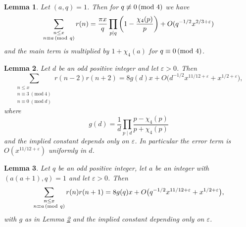 \documentclass[10pt,a4paper]{amsart}
\newtheorem{lemma}{Lemma}
\renewcommand{\pmod}[1]{\mkern3mu(\mathrm{mod}\ #1)}
\begin{document}
\begin{lemma}\label{rinAps}
	Let $(a,q)=1$. 
	Then for $q \not\equiv 0 \pmod 4$ we have
	\[
		\sum_{\substack{n \leq x \\ n \equiv a \pmod q}} r(n) = \frac{\pi x}{q}\prod_{p \mid q} \left(1-\frac{\chi_4(p)}{p}\right) + O (q^{-1/2}x^{2/3+\varepsilon})
	\]		
and the main term is multiplied by $1+\chi_4(a)$ for $q \equiv 0 \pmod 4$.
\end{lemma} 

\begin{lemma} \label{convr}
    Let $d$ be an odd positive integer and let $\varepsilon > 0$. Then
    \[
        \sum_{\substack{n\le x\\ n\equiv3\ (\mathrm{mod}\ 4)\\ n\equiv0\ (\mathrm{mod}\ d)}}r(n-2)r(n+2) = 8g(d)x+O\big(d^{-1/2}x^{11/12+\varepsilon}+x^{1/2+\varepsilon}\big),
    \]
    where
    \[
        g(d) = \frac{1}{d} \prod_{p\mid d}\frac{p-\chi_4(p)}{p+\chi_4(p)}
    \]
    and the implied constant depends only on $\varepsilon$. 
    In particular the error term is $O(x^{11/12+\varepsilon})$ uniformly in $d$.
\end{lemma}

\begin{lemma}\label{convr-even}
    Let $q$ be an odd positive integer, let $a$ be an integer with $(a(a+1),q) = 1$ and let
    $\varepsilon > 0$. Then
    \[
        \sum_{\substack{n \le x\\ n \equiv a \pmod q}} r(n) r(n+1)
        = 8g(q)x + O\bigl(q^{-1/2}x^{11/12+\varepsilon}+x^{1/2+\varepsilon}\bigr),
    \]
    with $g$ as in Lemma \ref{convr} and the implied constant depending only on $\varepsilon$.
\end{lemma}
\end{document}
